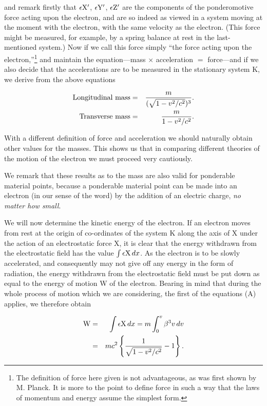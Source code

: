 \documentclass{article}
\begin{document}
\noindent
and remark firstly that $\epsilon{\rm X}'$, $\epsilon{\rm Y}'$,
$\epsilon{\rm Z}'$
are the components of the ponderomotive force acting upon the
electron, and are so indeed as viewed in a system moving at the
moment with the electron, with the same velocity as the
electron.  (This force might be measured, for example, by a
spring balance at rest in the last-mentioned system.) Now if we
call this force simply ``the force acting upon the
electron,''\footnote{The definition of force here given is not
advantageous, as was first shown by M. Planck.  It is more to
the point to define force in such a way that the laws of
momentum and energy assume the simplest form.} and maintain the
equation---mass $\times$ acceleration $=$ force---and if we also
decide that the accelerations are to be measured in the
stationary system K, we derive from the above equations

\begin{eqnarray*}
{\rm Longitudinal\ mass} & = & \frac{m}{(\sqrt{1-v^2/c^2})^3}. \\
{\rm Transverse\ mass} &  = & \frac{m}{1-v^2/c^2}.
\end{eqnarray*}

With a different definition of force and acceleration we should
naturally obtain other values for the masses.  This shows us that in
comparing different theories of the motion of the electron we must
proceed very cautiously.

We remark that these results as to the mass are also valid for
ponderable material points, because a ponderable material point can be
made into an electron (in our sense of the word) by the addition of an
electric charge, {\em no matter how small}.

We will now determine the kinetic energy of the electron.  If an
electron moves from rest at the origin of co-ordinates of the system
K along the axis of X under the action of an electrostatic force X,
it is clear that the energy withdrawn from the electrostatic field has
the value $\int\epsilon{\rm X}\,dx$.
As the electron is to be slowly accelerated, and
consequently may not give off any energy in the form of radiation, the
energy withdrawn from the electrostatic field must be put down as
equal to the energy of motion W of the electron.  Bearing in mind that
during the whole process of motion which we are considering, the first
of the equations (A) applies, we therefore obtain

\begin{eqnarray*}
{\rm W} & = & \int\epsilon{\rm X}\,dx = m\int_0^v\beta^3v\,dv\\
        & = & mc^2\left\{\frac{1}{\sqrt{1-v^2/c^2}}-1\right\}. \\
\end{eqnarray*}
\end{document}
